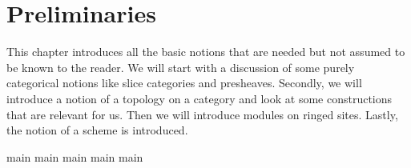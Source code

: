 \chapter{Preliminaries}
This chapter introduces all the basic notions that are needed but not assumed to be known to the reader.
We will start with a discussion of some purely categorical notions like slice categories and presheaves.
Secondly, we will introduce a notion of a topology on a category and look at some constructions that are relevant for us.
Then we will introduce modules on ringed sites.
Lastly, the notion of a scheme is introduced.

{main}
{main}
{main}
{main}
{main}